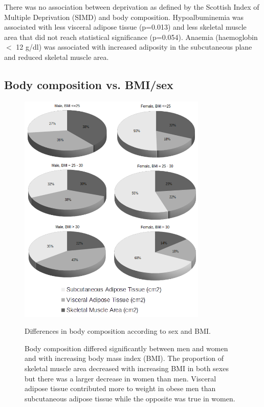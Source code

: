There was no association between deprivation as defined by the Scottish Index of Multiple Deprivation (SIMD) and body composition.
Hypoalbuminemia was associated with less visceral adipose tissue (p=0.013) and less skeletal muscle area that did not reach statistical significance (p=0.054). 
Anaemia (haemoglobin $<$ 12 g/dl) was associated with increased adiposity in the subcutaneous plane and reduced skeletal muscle area. 
	
\clearpage

\subsection{Body composition vs. BMI/sex}

\begin{figure}[htb]
	\centering
	\includegraphics[width=0.8\textwidth]{Figures/bc_gender_bmi_pie}
	\caption{Differences in body composition according to sex and BMI.}
	\caption*{Body composition differed significantly between men and women and with increasing body mass index (BMI). The proportion of skeletal muscle area decreased with increasing BMI in both sexes but there was a larger decrease in women than men. Visceral adipose tissue contributed more to weight in obese men than subcutaneous adipose tissue while the opposite was true in women.}
	\label{fig:bc_gender_bmi}
\end{figure}

